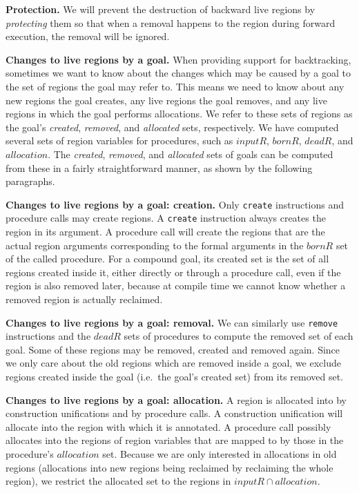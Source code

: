 \documentclass{tlp}
\def\bornRegs{\mathit{bornR}}
\def\deadRegs{\mathit{deadR}}
\def\inputRegs{\mathit{inputR}}
\def\allocationRegs{\mathit{allocation}}
\newcommand{\code}[1]{{\tt#1}}
\begin{document}
\noindent\textbf{Protection.}
We will prevent the destruction of backward live regions
by \emph{protecting} them so that
when a removal happens to the region during forward execution,
the removal will be ignored.

\noindent\textbf{Changes to live regions by a goal.}
When providing support for backtracking,
sometimes we want to know about the changes which may be caused
by a goal to the set of regions the goal may refer to.
This means we need to know about
any new regions the goal creates, any live regions the goal removes,
and any live regions in which the goal performs allocations.
We refer to these sets of regions as the goal's
\emph{created}, \emph{removed}, and \emph{allocated} sets, respectively.
We have computed several sets of region variables for procedures,
such as $\inputRegs$, $\bornRegs$, $\deadRegs$, and $\allocationRegs$.
The \emph{created}, \emph{removed}, and \emph{allocated} sets of goals
can be computed from these in a fairly straightforward manner,
as shown by the following paragraphs.

\noindent\textbf{Changes to live regions by a goal: creation.}
Only \code{create} instructions and procedure calls may create regions.
A \code{create} instruction always creates the region in its argument.
A procedure call will create the regions
that are the actual region arguments corresponding to the formal arguments
in the ${bornR}$ set of the called procedure.
For a compound goal,
its created set is the set of all regions created inside it,
either directly or through a procedure call,
even if the region is also removed later,
because at compile time we cannot know
whether a removed region is actually reclaimed.

\noindent\textbf{Changes to live regions by a goal: removal.}
We can similarly use
\code{remove} instructions and the $\deadRegs$ sets of procedures
to compute the removed set of each goal.
Some of these regions may be removed, created and removed again.
Since we only care about the old regions which are removed inside a goal,
we exclude regions created inside the goal (i.e.\ the goal’s created set)
from its removed set.

\noindent\textbf{Changes to live regions by a goal: allocation.}
A region is allocated into by construction unifications and by procedure calls.
A construction unification will allocate
into the region with which it is annotated.
A procedure call possibly allocates into the regions of region variables
that are mapped to by those in the procedure's $\allocationRegs$ set.
Because we are only interested in allocations in old regions
(allocations into new regions being reclaimed by reclaiming the whole region),
we restrict the allocated set
to the regions in $\inputRegs \cap \allocationRegs$.
\end{document}

